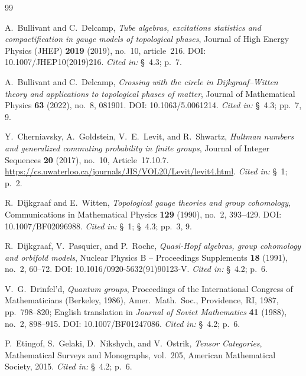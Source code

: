\documentclass[11pt]{article}
\theoremstyle{definition}
\theoremstyle{remark}
\theoremstyle{definition}
\theoremstyle{plain}
\newcommand{\citedin}[1]{\newblock \emph{Cited in:} #1.}
\begin{document}
\begin{thebibliography}{99}

A.~Bullivant and C.~Delcamp,
\newblock \emph{Tube algebras, excitations statistics and compactification in gauge models of topological phases},
\newblock Journal of High Energy Physics (JHEP) \textbf{2019} (2019), no.~10, article~216.
\newblock DOI: 10.1007/JHEP10(2019)216.
\citedin{\S~4.3; p.~7}

A.~Bullivant and C.~Delcamp,
\newblock \emph{Crossing with the circle in Dijkgraaf--Witten theory and applications to topological phases of matter},
\newblock Journal of Mathematical Physics \textbf{63} (2022), no.~8, 081901.
\newblock DOI: 10.1063/5.0061214.
\citedin{\S~4.3; pp.~7, 9}

Y.~Cherniavsky, A.~Goldstein, V.~E.~Levit, and R.~Shwartz,
\newblock \emph{Hultman numbers and generalized commuting probability in finite groups},
\newblock Journal of Integer Sequences \textbf{20} (2017), no.~10, Article~17.10.7.
\newblock \url{https://cs.uwaterloo.ca/journals/JIS/VOL20/Levit/levit4.html}.
\citedin{\S~1; p.~2}

R.~Dijkgraaf and E.~Witten,
\newblock \emph{Topological gauge theories and group cohomology},
\newblock Communications in Mathematical Physics \textbf{129} (1990), no.~2, 393--429.
\newblock DOI: 10.1007/BF02096988.
\citedin{\S~1; \S~4.3; pp.~3, 9}

R.~Dijkgraaf, V.~Pasquier, and P.~Roche,
\newblock \emph{Quasi-Hopf algebras, group cohomology and orbifold models},
\newblock Nuclear Physics B -- Proceedings Supplements \textbf{18} (1991), no.~2, 60--72.
\newblock DOI: 10.1016/0920-5632(91)90123-V.
\citedin{\S~4.2; p.~6}

V.~G.~Drinfel'd,
\newblock \emph{Quantum groups},
\newblock Proceedings of the International Congress of Mathematicians (Berkeley, 1986),
\newblock Amer.\ Math.\ Soc., Providence, RI, 1987, pp.~798--820;
\newblock English translation in \emph{Journal of Soviet Mathematics} \textbf{41} (1988), no.~2, 898--915.
\newblock DOI: 10.1007/BF01247086.
\citedin{\S~4.2; p.~6}

P.~Etingof, S.~Gelaki, D.~Nikshych, and V.~Ostrik,
\newblock \emph{Tensor Categories},
\newblock Mathematical Surveys and Monographs, vol.~205, American Mathematical Society, 2015.
\citedin{\S~4.2; p.~6}


\end{thebibliography}
\end{document}
